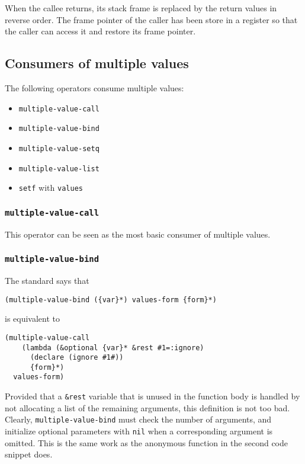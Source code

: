 When the callee returns, its stack frame is replaced by the return
values in reverse order.  The frame pointer of the caller has been
store in a register so that the caller can access it and restore its
frame pointer.

\subsection{Consumers of multiple values}

The following operators consume multiple values:

\begin{itemize}
\item \texttt{multiple-value-call}
\item \texttt{multiple-value-bind}
\item \texttt{multiple-value-setq}
\item \texttt{multiple-value-list}
\item \texttt{setf} with \texttt{values}
\end{itemize}

\subsubsection{\texttt{multiple-value-call}}

This operator can be seen as the most basic consumer of multiple
values.

\subsubsection{\texttt{multiple-value-bind}}

The standard says that

\begin{verbatim}
(multiple-value-bind ({var}*) values-form {form}*)
\end{verbatim}

is equivalent to

\begin{verbatim}
(multiple-value-call
    (lambda (&optional {var}* &rest #1=:ignore)
      (declare (ignore #1#))
      {form}*)
  values-form)
\end{verbatim}

Provided that a \texttt{\&rest} variable that is unused in the
function body is handled by not allocating a list of the remaining
arguments, this definition is not too bad.  Clearly,
\texttt{multiple-value-bind} must check the number of arguments, and
initialize optional parameters with \texttt{nil} when a corresponding
argument is omitted.  This is the same work as the anonymous function
in the second code snippet does.

